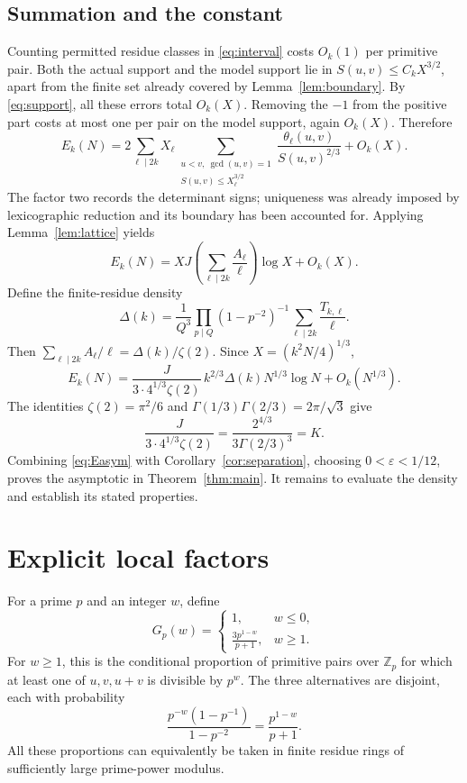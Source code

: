 \documentclass[11pt,a4paper]{article}
\numberwithin{equation}{section}
\theoremstyle{remark}
\newcommand{\Z}{\mathbb Z}
\newcommand{\eps}{\varepsilon}
\begin{document}
\subsection{Summation and the constant}
Counting permitted residue classes in \eqref{eq:interval} costs $O_k(1)$ per primitive pair. Both the actual support and the model support lie in $S(u,v)\le C_kX^{3/2}$, apart from the finite set already covered by Lemma~\ref{lem:boundary}. By \eqref{eq:support}, all these errors total $O_k(X)$. Removing the $-1$ from the positive part costs at most one per pair on the model support, again $O_k(X)$. Therefore
\begin{equation}\label{eq:Esum}
E_k(N)=2\sum_{\ell\mid2k}X_\ell
\sum_{\substack{u<v,\ \gcd(u,v)=1\\S(u,v)\le X_\ell^{3/2}}}
\frac{\theta_\ell(u,v)}{S(u,v)^{2/3}}+O_k(X).
\end{equation}
The factor two records the determinant signs; uniqueness was already imposed by lexicographic reduction and its boundary has been accounted for. Applying Lemma~\ref{lem:lattice} yields
\begin{equation}\label{eq:EasymX}
E_k(N)=XJ\left(\sum_{\ell\mid2k}\frac{A_\ell}{\ell}\right)\log X+O_k(X).
\end{equation}
Define the finite-residue density
\begin{equation}\label{eq:deltaresidue}
\Delta(k)=\frac1{Q^3}\prod_{p\mid Q}(1-p^{-2})^{-1}
\sum_{\ell\mid2k}\frac{T_{k,\ell}}{\ell}.
\end{equation}
Then $\sum_{\ell\mid2k}A_\ell/\ell=\Delta(k)/\zeta(2)$. Since $X=(k^2N/4)^{1/3}$,
\begin{equation}\label{eq:Easym}
E_k(N)=\frac{J}{3\cdot4^{1/3}\zeta(2)}\,k^{2/3}\Delta(k)N^{1/3}\log N+O_k(N^{1/3}).
\end{equation}
The identities $\zeta(2)=\pi^2/6$ and $\Gamma(1/3)\Gamma(2/3)=2\pi/\sqrt3$ give
\[
\frac{J}{3\cdot4^{1/3}\zeta(2)}=\frac{2^{4/3}}{3\Gamma(2/3)^3}=K.
\]
Combining \eqref{eq:Easym} with Corollary~\ref{cor:separation}, choosing $0<\eps<1/12$, proves the asymptotic in Theorem~\ref{thm:main}. It remains to evaluate the density and establish its stated properties.

\section{Explicit local factors}\label{sec:local}
For a prime $p$ and an integer $w$, define
\begin{equation}\label{eq:G}
G_p(w)=\begin{cases}
1,&w\le0,\\[2pt]
\displaystyle\frac{3p^{1-w}}{p+1},&w\ge1.
\end{cases}
\end{equation}
For $w\ge1$, this is the conditional proportion of primitive pairs over $\Z_p$ for which at least one of $u,v,u+v$ is divisible by $p^w$. The three alternatives are disjoint, each with probability
\[
\frac{p^{-w}(1-p^{-1})}{1-p^{-2}}=\frac{p^{1-w}}{p+1}.
\]
All these proportions can equivalently be taken in finite residue rings of sufficiently large prime-power modulus.
\end{document}
